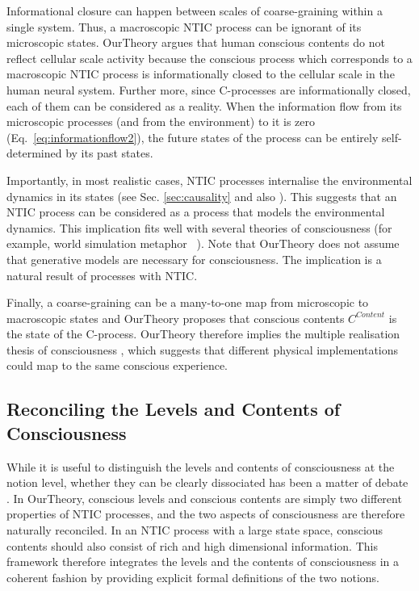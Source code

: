 \documentclass[utf8]{article}
\begin{document}
    		Informational closure can happen between scales of coarse-graining within a single system. Thus, a macroscopic NTIC process can be ignorant of its microscopic states. \ac{OurTheory} argues that human conscious contents do not reflect cellular scale activity because the conscious process which corresponds to a macroscopic NTIC process is informationally closed to the cellular scale in the human neural system. Further more, since C-processes are informationally closed, each of them can be considered as a reality. When the information flow from its microscopic processes (and from the environment) to it is zero (Eq.~\ref{eq:informationflow2}), the future states of the process can be entirely self-determined by its past states. 
    		
    		Importantly, in most realistic cases, NTIC processes internalise the environmental dynamics in its states (see Sec. \ref{sec:causality} and also \cite{BERTSCHINGER.2006}). This suggests that an NTIC process can be considered as a process that models the environmental dynamics. This implication fits well with several theories of consciousness (for example, world simulation metaphor ~\citep{revonsuo2006inner}). Note that \ac{OurTheory} does not assume that generative models are necessary for consciousness. The implication is a natural result of processes with NTIC. 
            
            Finally, a coarse-graining can be a many-to-one map from microscopic to macroscopic states and \ac{OurTheory} proposes that conscious contents $C^{Content}$ is the state of the C-process. \ac{OurTheory} therefore implies the multiple realisation thesis of consciousness \citep{putnam1967psychological,bechtel1999multiple}, which suggests that different physical implementations could map to the same conscious experience.
            
            
	    \subsection{Reconciling the Levels and Contents of Consciousness}\label{sec:reconcile}
    	    While it is useful to distinguish the levels and contents of consciousness at the notion level, whether they can be clearly dissociated has been a matter of debate \citep{bayne2016there, Fazekas2016}. In \ac{OurTheory}, conscious levels and conscious contents are simply two different properties of NTIC processes, and the two aspects of consciousness are therefore naturally reconciled. In an NTIC process with a large state space, conscious contents should also consist of rich and high dimensional information. This framework therefore integrates the levels and the contents of consciousness in a coherent fashion by providing explicit formal definitions of the two notions.  
    	    
\end{document}
